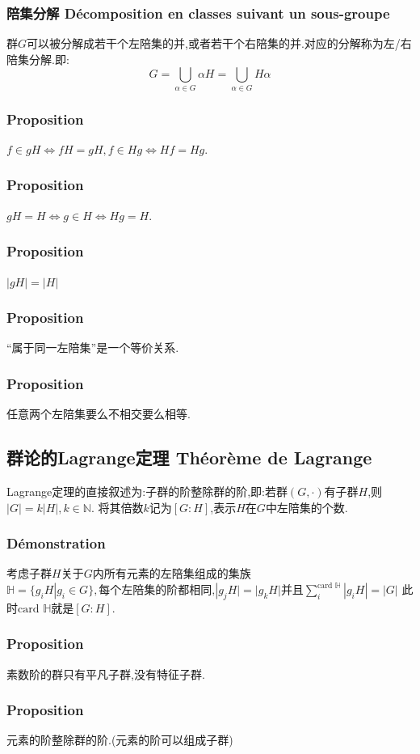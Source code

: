 \documentclass[12pt, a4paper, oneside]{ctexbook}
\begin{document}
  \subsubsection{陪集分解 Décomposition en classes suivant un sous-groupe}
  群$G$可以被分解成若干个左陪集的并,或者若干个右陪集的并.对应的分解称为左/右陪集分解.即:
  $$
  G=\bigcup_{\alpha\in G}\alpha H= \bigcup_{\alpha\in G}H\alpha
  $$
  \subsubsection{Proposition}
  $f\in gH\Leftrightarrow fH=gH,f\in Hg\Leftrightarrow Hf=Hg$.
  \subsubsection{Proposition}
  $gH=H\Leftrightarrow g\in H\Leftrightarrow Hg=H$.
  \subsubsection{Proposition}
  $|gH|=|H|$
  \subsubsection{Proposition}
  “属于同一左陪集”是一个等价关系.
  \subsubsection{Proposition}
  任意两个左陪集要么不相交要么相等.

  \subsection{群论的Lagrange定理 Théorème de Lagrange}
  Lagrange定理的直接叙述为:子群的阶整除群的阶,即:若群$(G,\cdot)$有子群$H$,则$|G|=k|H|,k\in\mathbb{N}$.
  将其倍数$k$记为$[G:H]$,表示$H$在$G$中左陪集的个数.
  \subsubsection{Démonstration}
  考虑子群$H$关于$G$内所有元素的左陪集组成的集族$\mathbb{H}=\{g_iH|g_i\in G\},\text{每个左陪集的阶都相同,}|g_jH|=|g_kH|$并且$\sum_{i}^{\text{card }\mathbb{H}}|g_iH|=|G|$
  此时$\text{card }\mathbb{H} $就是$[G:H]$.
  \subsubsection{Proposition}
  素数阶的群只有平凡子群,没有特征子群.
  \subsubsection{Proposition}
  元素的阶整除群的阶.(元素的阶可以组成子群)
\end{document}
